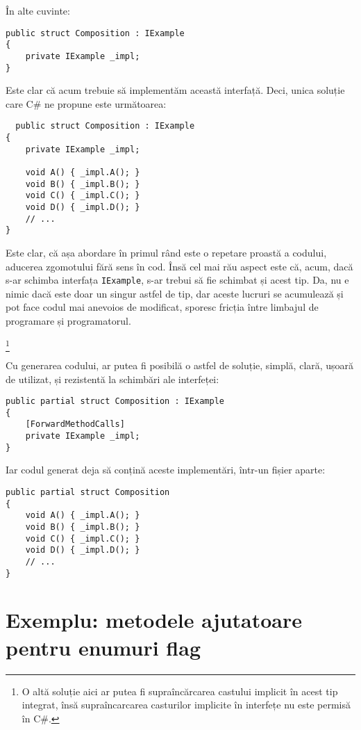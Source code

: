 \documentclass[a4paper,12pt]{report}
\begin{document}
În alte cuvinte:

\begin{lstlisting}
public struct Composition : IExample
{
    private IExample _impl;
}
\end{lstlisting}

Este clar că acum trebuie să implementăm această interfață.
Deci, unica soluție care C\# ne propune este următoarea:

\begin{lstlisting}
  public struct Composition : IExample
{
    private IExample _impl;

    void A() { _impl.A(); }
    void B() { _impl.B(); }
    void C() { _impl.C(); }
    void D() { _impl.D(); }
    // ...
}
\end{lstlisting}

Este clar, că așa abordare în primul rând este o repetare proastă a codului, aducerea zgomotului fără sens în cod.
Însă cel mai rău aspect este că, acum, dacă s-ar schimba interfața \texttt{IExample}, s-ar trebui să fie schimbat și acest tip. 
Da, nu e nimic dacă este doar un singur astfel de tip, dar aceste lucruri se acumulează și pot face codul mai anevoios de modificat, sporesc fricția între limbajul de programare și programatorul.

\footnote{
  O altă soluție aici ar putea fi supraîncărcarea castului implicit în acest tip integrat,
  însă supraîncarcarea casturilor implicite în interfețe nu este permisă în C\#.
}

Cu generarea codului, ar putea fi posibilă o astfel de soluție, simplă, clară, ușoară de utilizat, și rezistentă la schimbări ale interfeței:

\begin{lstlisting}
public partial struct Composition : IExample
{
    [ForwardMethodCalls]
    private IExample _impl;
}
\end{lstlisting}

Iar codul generat deja să conțină aceste implementări, într-un fișier aparte:

\begin{lstlisting}
public partial struct Composition
{
    void A() { _impl.A(); }
    void B() { _impl.B(); }
    void C() { _impl.C(); }
    void D() { _impl.D(); }
    // ...
}
\end{lstlisting}


\section{Exemplu: metodele ajutatoare pentru enumuri flag}
\end{document}
